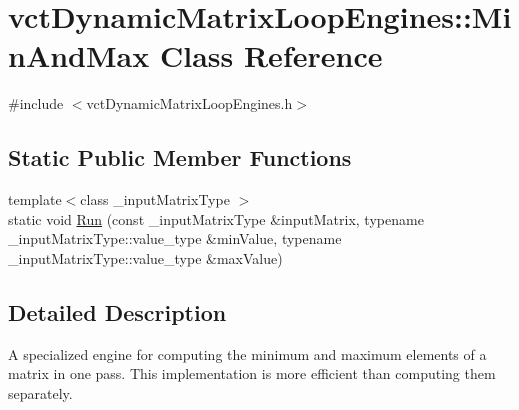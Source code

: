 \hypertarget{classvct_dynamic_matrix_loop_engines_1_1_min_and_max}{\section{vct\-Dynamic\-Matrix\-Loop\-Engines\-:\-:Min\-And\-Max Class Reference}
\label{classvct_dynamic_matrix_loop_engines_1_1_min_and_max}
}


{\ttfamily \#include $<$vct\-Dynamic\-Matrix\-Loop\-Engines.\-h$>$}

\subsection*{Static Public Member Functions}
\begin{DoxyCompactItemize}
\item 
{\footnotesize template$<$class \-\_\-input\-Matrix\-Type $>$ }\\static void \hyperlink{classvct_dynamic_matrix_loop_engines_1_1_min_and_max_a78ed7a948a1ba0bc51d07ec77baeafff}{Run} (const \-\_\-input\-Matrix\-Type \&input\-Matrix, typename \-\_\-input\-Matrix\-Type\-::value\-\_\-type \&min\-Value, typename \-\_\-input\-Matrix\-Type\-::value\-\_\-type \&max\-Value)
\end{DoxyCompactItemize}


\subsection{Detailed Description}
A specialized engine for computing the minimum and maximum elements of a matrix in one pass. This implementation is more efficient than computing them separately. 

